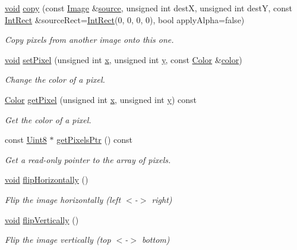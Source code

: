 \begin{DoxyCompactItemize}
\hyperlink{glutf90_8h_ac778d6f63f1aaf8ebda0ce6ac821b56e}{void} \hyperlink{classsf_1_1_image_ab2fa337c956f85f93377dcb52153a45a}{copy} (const \hyperlink{classsf_1_1_image}{Image} \&\hyperlink{gl3_8h_a6ffd2192cbc75d017665e95207ee36a7}{source}, unsigned int dest\-X, unsigned int dest\-Y, const \hyperlink{namespacesf_aae67411782674934f78d55fa3af18403}{Int\-Rect} \&source\-Rect=\hyperlink{namespacesf_aae67411782674934f78d55fa3af18403}{Int\-Rect}(0, 0, 0, 0), bool apply\-Alpha=false)
\begin{DoxyCompactList}\small\item\em Copy pixels from another image onto this one. \end{DoxyCompactList}\item 
\hyperlink{glutf90_8h_ac778d6f63f1aaf8ebda0ce6ac821b56e}{void} \hyperlink{classsf_1_1_image_a9fd329b8cd7d4439e07fb5d3bb2d9744}{set\-Pixel} (unsigned int \hyperlink{gl3_8h_a92d0386e5c19fb81ea88c9f99644ab1d}{x}, unsigned int \hyperlink{gl3_8h_a66ddd433d2cacfe27f5906b7e86faeed}{y}, const \hyperlink{classsf_1_1_color}{Color} \&\hyperlink{gl3_8h_a3ea846f998d64f079b86052b6c4193a8}{color})
\begin{DoxyCompactList}\small\item\em Change the color of a pixel. \end{DoxyCompactList}\item 
\hyperlink{classsf_1_1_color}{Color} \hyperlink{classsf_1_1_image_a8c8460e311dcb00557cb00a81c29163d}{get\-Pixel} (unsigned int \hyperlink{gl3_8h_a92d0386e5c19fb81ea88c9f99644ab1d}{x}, unsigned int \hyperlink{gl3_8h_a66ddd433d2cacfe27f5906b7e86faeed}{y}) const 
\begin{DoxyCompactList}\small\item\em Get the color of a pixel. \end{DoxyCompactList}\item 
const \hyperlink{namespacesf_a4ef3d630785c4f296f9b4f274c33d78e}{Uint8} $\ast$ \hyperlink{classsf_1_1_image_ac6137a608a9efaae2735c13ff259c214}{get\-Pixels\-Ptr} () const 
\begin{DoxyCompactList}\small\item\em Get a read-\/only pointer to the array of pixels. \end{DoxyCompactList}\item 
\hyperlink{glutf90_8h_ac778d6f63f1aaf8ebda0ce6ac821b56e}{void} \hyperlink{classsf_1_1_image_a57168e7bc29190e08bbd6c9c19f4bb2c}{flip\-Horizontally} ()
\begin{DoxyCompactList}\small\item\em Flip the image horizontally (left $<$-\/$>$ right) \end{DoxyCompactList}\item 
\hyperlink{glutf90_8h_ac778d6f63f1aaf8ebda0ce6ac821b56e}{void} \hyperlink{classsf_1_1_image_a78a702a7e49d1de2dec9894da99d279c}{flip\-Vertically} ()
\begin{DoxyCompactList}\small\item\em Flip the image vertically (top $<$-\/$>$ bottom) \end{DoxyCompactList}\end{DoxyCompactItemize}



